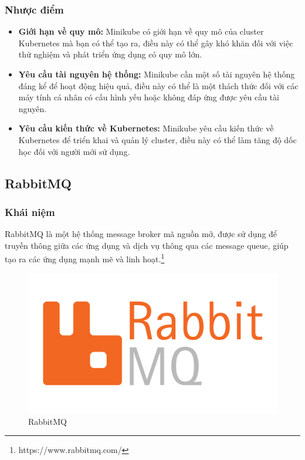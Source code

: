 \subsubsection{Nhược điểm}
\begin{itemize}
  \item \textbf{Giới hạn về quy mô:} Minikube có giới hạn về quy mô của cluster Kubernetes mà bạn có thể tạo ra, điều này có thể gây khó khăn đối với việc thử nghiệm và phát triển ứng dụng có quy mô lớn.
  \item \textbf{Yêu cầu tài nguyên hệ thống:} Minikube cần một số tài nguyên hệ thống đáng kể để hoạt động hiệu quả, điều này có thể là một thách thức đối với các máy tính cá nhân có cấu hình yếu hoặc không đáp ứng được yêu cầu tài nguyên.
  \item \textbf{Yêu cầu kiến thức về Kubernetes:} Minikube yêu cầu kiến thức về Kubernetes để triển khai và quản lý cluster, điều này có thể làm tăng độ dốc học đối với người mới sử dụng.
\end{itemize}
\subsection{RabbitMQ}
\subsubsection{Khái niệm}
\noindent RabbitMQ là một hệ thống message broker mã nguồn mở, được sử dụng để truyền thông giữa các ứng dụng và dịch vụ thông qua các message queue, giúp tạo ra các ứng dụng mạnh mẽ và linh hoạt.\footnote{https://www.rabbitmq.com/}
\begin{figure}[H]
  \begin{center}
    \includegraphics[scale=0.3]{images/hieu/phuluc/rabbitmq.png}
    \caption{RabbitMQ}
  \end{center}
\end{figure}

